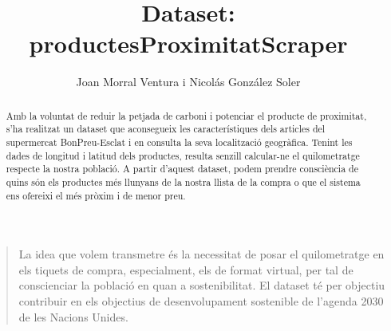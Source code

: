 \documentclass[]{scrartcl}
\title{Dataset: productesProximitatScraper}
\author{Joan Morral Ventura i Nicolás González Soler}
\begin{document}
\maketitle

\begin{abstract}
Amb la voluntat de reduir la petjada de carboni i potenciar el producte de proximitat, s'ha realitzat un dataset que aconsegueix les característiques dels articles del supermercat BonPreu-Esclat i en consulta la seva localització geogràfica. Tenint les dades de longitud i latitud dels productes, resulta senzill calcular-ne el quilometratge respecte la nostra població. A partir d'aquest dataset, podem prendre consciència de quins són els productes més llunyans de la nostra llista de la compra o que el sistema ens ofereixi el més pròxim i de menor preu. 
\end{abstract}

\begin{quote}
	La idea que volem transmetre és la necessitat de posar el quilometratge en els tiquets de compra, especialment, els de format virtual, per tal de conscienciar la població en quan a sostenibilitat. El dataset té per objectiu contribuir en els objectius de desenvolupament sostenible de l'agenda 2030 de les Nacions Unides.
\end{quote}
\end{document}
